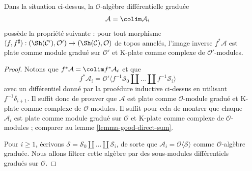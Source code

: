 \begin{lemma}
\label{lemma-special-good}
Dans la situation ci-dessus, la $\mathcal{O}$-algèbre différentielle graduée
$$
\mathcal{A} = \colim \mathcal{A}_i
$$
possède la propriété suivante : pour tout morphisme
$(f, f^\sharp) : (\Sh(\mathcal{C}'), \mathcal{O}')
\to (\Sh(\mathcal{C}), \mathcal{O})$
de topos annelés, l'image inverse $f^*\mathcal{A}$
est plate comme module gradué sur $\mathcal{O}'$
et K-plate comme complexe de $\mathcal{O}'$-modules.
\end{lemma}

\begin{proof}
Notons que $f^*\mathcal{A} = \colim f^*\mathcal{A}_i$
et que
$$
f^*\mathcal{A}_i = \mathcal{O}'\langle
f^{-1}\mathcal{S}_0 \amalg \ldots \amalg f^{-1}\mathcal{S}_i\rangle
$$
avec un différentiel donné par la procédure inductive ci-dessus en
utilisant $f^{-1}\delta_{i + 1}$. Il suffit donc de prouver que $\mathcal{A}$
est plate comme $\mathcal{O}$-module gradué
et K-plate comme complexe de $\mathcal{O}$-modules.
Il suffit pour cela de montrer que chaque $\mathcal{A}_i$
est plate comme module gradué sur $\mathcal{O}$
et K-plate comme complexe de $\mathcal{O}$-modules ; comparer au
lemme \ref{lemma-good-direct-sum}.


\medskip\noindent
Pour $i \geq 1$,
écrivons $\mathcal{S} = \mathcal{S}_0 \amalg \ldots \amalg \mathcal{S}_i$,
de sorte que $\mathcal{A}_i = \mathcal{O}\langle \mathcal{S} \rangle$
comme $\mathcal{O}$-algèbre graduée. Nous allons filtrer cette algèbre
par des sous-modules différentiels gradués sur $\mathcal{O}$.


\end{proof}
